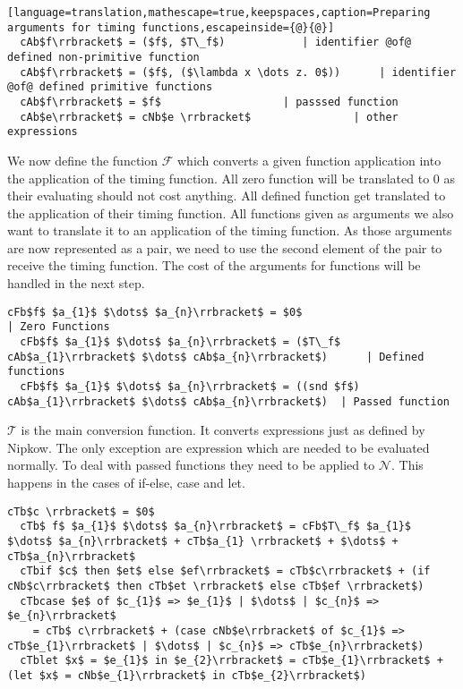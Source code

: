 \begin{lstlisting}[language=translation,mathescape=true,keepspaces,caption=Preparing arguments for timing functions,escapeinside={@}{@}]
  cAb$f\rrbracket$ = ($f$, $T\_f$)            | identifier @of@ defined non-primitive function
  cAb$f\rrbracket$ = ($f$, ($\lambda x \dots z. 0$))      | identifier @of@ defined primitive functions
  cAb$f\rrbracket$ = $f$                   | passsed function
  cAb$e\rrbracket$ = cNb$e \rrbracket$                | other expressions
\end{lstlisting}

We now define the function $\mathcal{F}$ which converts a given function application into the application of the timing function.
All zero function will be translated to $0$ as their evaluating should not cost anything.
All defined function get translated to the application of their timing function.
All functions given as arguments we also want to translate it to an application of the timing function.
As those arguments are now represented as a pair, we need to use the second element of the pair to receive the timing function.
The cost of the arguments for functions will be handled in the next step.
\begin{lstlisting}[language=translation,mathescape=true,keepspaces,caption=Handling function applications]
  cFb$f$ $a_{1}$ $\dots$ $a_{n}\rrbracket$ = $0$                          | Zero Functions
  cFb$f$ $a_{1}$ $\dots$ $a_{n}\rrbracket$ = ($T\_f$ cAb$a_{1}\rrbracket$ $\dots$ cAb$a_{n}\rrbracket$)      | Defined functions
  cFb$f$ $a_{1}$ $\dots$ $a_{n}\rrbracket$ = ((snd $f$) cAb$a_{1}\rrbracket$ $\dots$ cAb$a_{n}\rrbracket$)  | Passed function
\end{lstlisting}

$\mathcal{T}$ is the main conversion function.
It converts expressions just as defined by Nipkow.
The only exception are expression which are needed to be evaluated normally.
To deal with passed functions they need to be applied to $\mathcal{N}$.
This happens in the cases of if-else, case and let.
\begin{lstlisting}[language=translation,mathescape=true,keepspaces]
  cTb$c \rrbracket$ = $0$
  cTb$ f$ $a_{1}$ $\dots$ $a_{n}\rrbracket$ = cFb$T\_f$ $a_{1}$ $\dots$ $a_{n}\rrbracket$ + cTb$a_{1} \rrbracket$ + $\dots$ + cTb$a_{n}\rrbracket$
  cTbif $c$ then $et$ else $ef\rrbracket$ = cTb$c\rrbracket$ + (if cNb$c\rrbracket$ then cTb$et \rrbracket$ else cTb$ef \rrbracket$)
  cTbcase $e$ of $c_{1}$ => $e_{1}$ | $\dots$ | $c_{n}$ => $e_{n}\rrbracket$
    = cTb$ c\rrbracket$ + (case cNb$e\rrbracket$ of $c_{1}$ => cTb$e_{1}\rrbracket$ | $\dots$ | $c_{n}$ => cTb$e_{n}\rrbracket$)
  cTblet $x$ = $e_{1}$ in $e_{2}\rrbracket$ = cTb$e_{1}\rrbracket$ + (let $x$ = cNb$e_{1}\rrbracket$ in cTb$e_{2}\rrbracket$)
\end{lstlisting}


